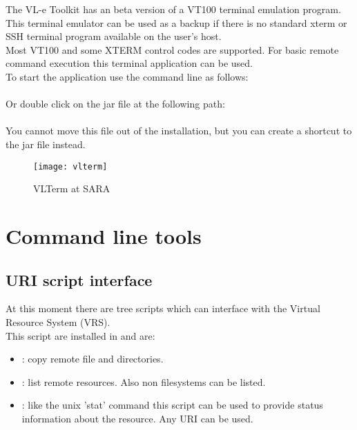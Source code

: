 The VL-e Toolkit has an beta version of a VT100 terminal emulation program.
This terminal emulator can be used as a backup if there is no standard xterm or SSH
terminal program available on the user's host.\\
Most VT100 and some XTERM control codes are supported. For basic remote
command execution this terminal application can be used.\\
To start the  application use the command line as follows:\\

	\tab {}\\

Or double click on the jar file at the following path:\\

	\tab {}\\

You cannot move this file out of the installation, but you can create a
shortcut to the jar file instead. \\ 

 \begin{figure}[htbp]
 \centerline{\texttt{[image: vlterm]}}
 \caption{VLTerm at SARA}
 \label{fig:vlterm}
 \end{figure}

\section{Command line tools}

\subsection{URI script interface}

At this moment there are tree scripts which can interface with the Virtual
Resource System (VRS).\\
This script are installed in  and are:\\
\begin{itemize}
  \item {} : copy remote file and directories.
  \item {} : list remote resources. Also non filesystems can be
  listed. 
  \item {} : like the unix 'stat' command this script can be used
  to provide status information about the resource.  Any URI can be used. 
\end{itemize}
   
